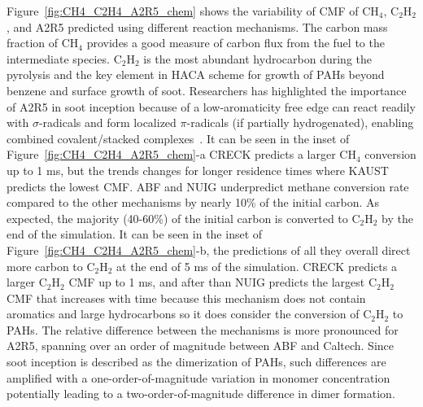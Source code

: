 Figure~\ref{fig:CH4_C2H4_A2R5_chem} shows the variability of CMF of $\mathrm{CH_4}$, $\mathrm{C_2H_2}$, and A2R5 predicted using different reaction mechanisms. The carbon mass fraction of $\mathrm{CH_4}$ provides a good measure of carbon flux from the fuel to the intermediate species. $\mathrm{C_2H_2}$ is the most abundant hydrocarbon during the pyrolysis and the key element in HACA scheme for growth of PAHs beyond benzene and surface growth of soot. Researchers has highlighted the importance of A2R5 in soot inception because of a low-aromaticity free edge can react readily with $\sigma$-radicals and form localized $\pi$-radicals (if partially hydrogenated), enabling combined covalent/stacked complexes~\citep{martin2019reactivity}. It can be seen in the inset of Figure~\ref{fig:CH4_C2H4_A2R5_chem}-a CRECK predicts a larger $\mathrm{CH_4}$ conversion up to 1 ms, but the trends changes for longer residence times where KAUST predicts the lowest CMF. ABF and NUIG underpredict methane conversion rate compared to the other mechanisms by nearly 10\% of the initial carbon. As expected, the majority (40-60\%) of the initial carbon is converted to $\mathrm{C_2H_2}$ by the end of the simulation. It can be seen in the inset of Figure~\ref{fig:CH4_C2H4_A2R5_chem}-b, the predictions of all they overall direct more carbon to $\mathrm{C_2H_2}$ at the end of 5 ms of the simulation. CRECK predicts a larger $\mathrm{C_2H_2}$ CMF up to 1 ms, and after than NUIG predicts the largest $\mathrm{C_2H_2}$ CMF that increases with time because this mechanism does not contain aromatics and large hydrocarbons so it does consider the conversion of $\mathrm{C_2H_2}$ to PAHs. The relative difference between the mechanisms is more pronounced for A2R5, spanning over an order of magnitude between ABF and Caltech. Since soot inception is described as the dimerization of PAHs, such differences are amplified with a one-order-of-magnitude variation in monomer concentration potentially leading to a two-order-of-magnitude difference in dimer formation. 
